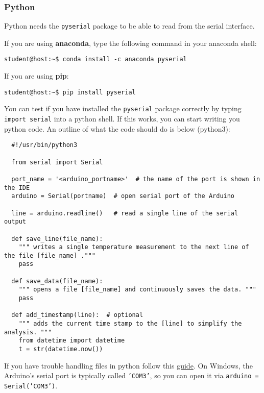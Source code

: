 \subsubsection{Python}
Python needs the \texttt{pyserial} package to be able to read from the serial interface.\par
%
\noindent If you are using \textbf{anaconda}, type the following command in your anaconda shell:
%
\begin{verbatim}
student@host:~$ conda install -c anaconda pyserial
\end{verbatim}
%
\noindent If you are using \textbf{pip}:
\begin{verbatim}
student@host:~$ pip install pyserial
\end{verbatim}
%
You can test if you have installed the \texttt{pyserial} package correctly by typing \texttt{import serial} into a python shell. If this works, you can start writing you python code. An outline of what the code should do is below (python3):
%
\mdfsetblack
\begin{verbatim}
  #!/usr/bin/python3
  
  from serial import Serial
  
  port_name = '<arduino_portname>'  # the name of the port is shown in the IDE
  arduino = Serial(portname)  # open serial port of the Arduino
  
  line = arduino.readline()   # read a single line of the serial output
  
  def save_line(file_name):  
    """ writes a single temperature measurement to the next line of the file [file_name] ."""
    pass
    
  def save_data(file_name):
    """ opens a file [file_name] and continuously saves the data. """
    pass
    
  def add_timestamp(line):  # optional
    """ adds the current time stamp to the [line] to simplify the analysis. """
    from datetime import datetime
    t = str(datetime.now())
\end{verbatim}
%
If you have trouble handling files in python follow this \href{http://www.pythonforbeginners.com/files/reading-and-writing-files-in-python}{guide}. On Windows, the Arduino's serial port is typically called \texttt{'COM3'}, so you can open it via \texttt{arduino = Serial('COM3')}.
%
